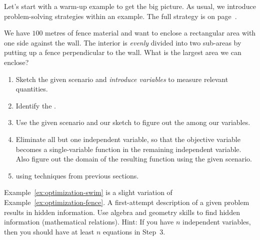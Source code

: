\documentclass[../main.tex]{subfiles}
\begin{document}
Let's start with a warm-up example to get the big picture. As usual, we introduce problem-solving strategies within an example. The full strategy is on page~\pageref{page:optimization-strategy}.
\begin{example} \label{ex:optimization-fence}
  We have \(100\) metres of fence material and want to enclose a rectangular area with one side against the wall. The interior is \emph{evenly} divided into two sub-areas by putting up a fence perpendicular to the wall. What is the largest area we can enclose?

  \begin{enumerate}[wide, noitemsep, label=(Step~\arabic*).]
    \item Sketch the given scenario and \emph{introduce variables} to measure relevant quantities.


    \item Identify the . 


    \item Use the given scenario and our sketch to figure out the  among our variables.

    \item Eliminate all but one independent variable, so that the objective variable becomes a single-variable function in the remaining independent variable. Also figure out the domain of the resulting function using the given scenario.

      \blanks*
      \clearpage

    \item {} using techniques from previous sections.

      \blanks*
  \end{enumerate}
\end{example}
\clearpage

Example~\ref{ex:optimization-swim} is a slight variation of Example~\ref{ex:optimization-fence}. A first-attempt description of a given problem results in hidden information. Use algebra and geometry skills to find hidden information (mathematical relations). Hint: If you have \(n\) independent variables, then you should have at least \(n\) equations in Step~3.
\end{document}
